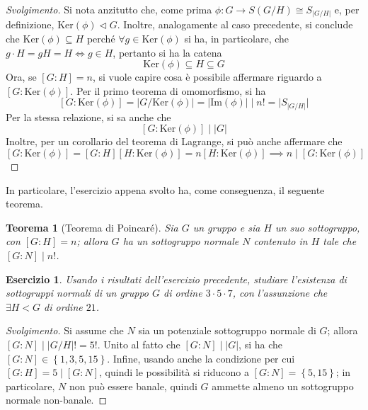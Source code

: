 \documentclass[11pt]{scrartcl}
\theoremstyle{style}
\newtheorem{teorema}{Teorema}[section]
\newtheorem{esercizio}{Esercizio}[section]
\newenvironment{svolgimento}{\renewcommand\qedsymbol{$\blacksquare$}\begin{proof}[Svolgimento]}{\end{proof}}
\numberwithin{equation}{subsection}
\begin{document}
\begin{svolgimento}
	Si nota anzitutto che, come prima $\phi : G \to S(G / H) \cong S_{\lvert G / H \rvert } $ e, per definizione, $\mathrm{Ker} (\phi )\lhd G$.
	Inoltre, analogamente al caso precedente, si conclude che $\mathrm{Ker} (\phi )\subseteq H$ perch\'e $\forall  g \in \mathrm{Ker} (\phi )$ si ha, in particolare, che $g\cdot  H=gH = H \iff g \in H $, pertanto si ha la catena
	\[
	\mathrm{Ker} (\phi ) \subseteq H \subseteq G
	\] 
	Ora, se $[G:H] = n$, si vuole capire cosa \`e possibile affermare riguardo a $[G : \mathrm{Ker} (\phi )]$.
	Per il primo teorema di omomorfismo, si ha
	\[
		[G:\mathrm{Ker} (\phi )] = \lvert G / \mathrm{Ker}(\phi )  \rvert = \lvert \mathrm{Im} (\phi ) \rvert  \mid n! = \lvert S _{\lvert G / H \rvert }  \rvert 
	\] 
	Per la stessa relazione, si sa anche che 
	\[
		[G : \mathrm{Ker} (\phi )]  \mid \lvert G \rvert 
	\] 
Inoltre, per un corollario del teorema di Lagrange, si pu\`o anche affermare che 
\[
	[G : \mathrm{Ker} (\phi )] = [G : H] [H:\mathrm{Ker} (\phi )] = n [H : \mathrm{Ker} (\phi )]\implies n  \mid [G : \mathrm{Ker} (\phi )]
\] 
\end{svolgimento}
In particolare, l'esercizio appena svolto ha, come conseguenza, il seguente teorema.
\begin{teorema}
	[Teorema di Poincar\'e]
	Sia $G$ un gruppo e sia $H$ un suo sottogruppo, con $[G: H] = n$; allora $G$ ha un sottogruppo normale $N$ contenuto in $H$ tale che $[G : N]  \mid n!$.
\end{teorema}
\begin{esercizio}
	Usando i risultati dell'esercizio precedente, studiare l'esistenza di sottogruppi normali di un gruppo $G$ di ordine $3\cdot 5 \cdot 7$, con l'assunzione che $\exists  H < G$ di ordine $21$.
\end{esercizio}
\begin{svolgimento}
	Si assume che $N$ sia un potenziale sottogruppo normale di $G$; allora $[G:N]  \mid \lvert G / H  \rvert ! = 5!$.
	Unito al fatto che $[G:N] \mid \lvert G \rvert $, si ha che $[G : N] \in  \left\{ 1,3,5,15 \right\} $.
	Infine, usando anche la condizione per cui $[G:H] = 5 \mid [G : N]$, quindi le possibilit\`a si riducono a $[G:N] = \left\{ 5,15 \right\} $; in particolare, $N$ non pu\`o essere banale, quindi $G$ ammette almeno un sottogruppo normale non-banale.
\end{svolgimento}
\end{document}
